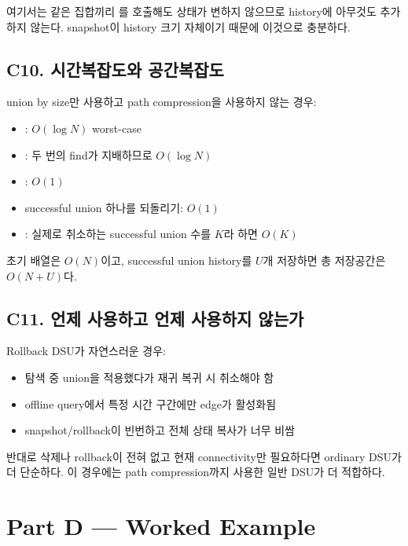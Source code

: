 여기서는 같은 집합끼리 를 호출해도 상태가 변하지 않으므로 history에 아무것도 추가하지 않는다. snapshot이 history 크기 자체이기 때문에 이것으로 충분하다.

\subsection{C10. 시간복잡도와 공간복잡도}
union by size만 사용하고 path compression을 사용하지 않는 경우:
\begin{itemize}
\item {}: $O(\log N)$ worst-case
\item {}: 두 번의 find가 지배하므로 $O(\log N)$
\item {}: $O(1)$
\item successful union 하나를 되돌리기: $O(1)$
\item {}: 실제로 취소하는 successful union 수를 $K$라 하면 $O(K)$
\end{itemize}

초기 배열은 $O(N)$이고, successful union history를 $U$개 저장하면 총 저장공간은 $O(N+U)$다.

\subsection{C11. 언제 사용하고 언제 사용하지 않는가}
Rollback DSU가 자연스러운 경우:
\begin{itemize}
\item 탐색 중 union을 적용했다가 재귀 복귀 시 취소해야 함
\item offline query에서 특정 시간 구간에만 edge가 활성화됨
\item snapshot/rollback이 빈번하고 전체 상태 복사가 너무 비쌈
\end{itemize}

반대로 삭제나 rollback이 전혀 없고 현재 connectivity만 필요하다면 ordinary DSU가 더 단순하다. 이 경우에는 path compression까지 사용한 일반 DSU가 더 적합하다.

\section{Part D --- Worked Example}

